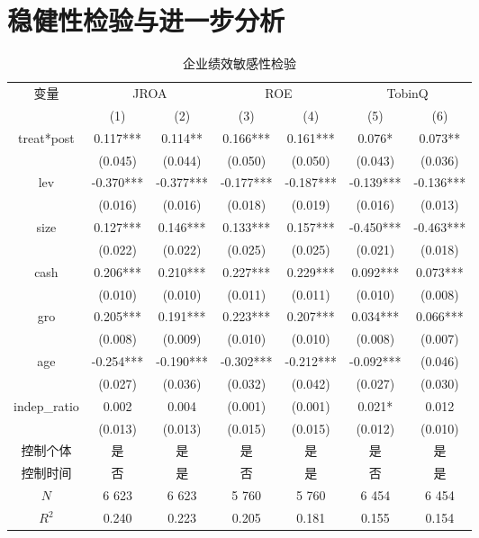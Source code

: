 \documentclass{beamer}	%
\theoremstyle{plain}
\theoremstyle{definition}
\theoremstyle{remark}
\numberwithin{equation}{section}
\begin{document}
\section{稳健性检验与进一步分析}
\begin{frame}
\begin{table}[htbp]
	\tiny
	\centering
	\caption{企业绩效敏感性检验}
	\label{企业绩效敏感性检验}%
	\begin{tabular}{ccccccc}
		\toprule
		\multirow{2}[3]{*}{变量} & \multicolumn{2}{c}{JROA} & \multicolumn{2}{c}{ROE} & \multicolumn{2}{c}{TobinQ} \\
		\cmidrule{2-7}          & (1)    & (2)    & (3)    & (4)    & (5)    & (6) \\
		\midrule
		\multirow{2}[0]{*}{treat*post} & \textcolor[rgb]{1.000, 0.000, 0.000}{0.117***} & \textcolor[rgb]{1.000, 0.000, 0.000}{0.114**} & \textcolor[rgb]{1.000, 0.000, 0.000}{0.166***} & \textcolor[rgb]{1.000, 0.000, 0.000}{0.161***} & \textcolor[rgb]{1.000, 0.000, 0.000}{0.076*} & \textcolor[rgb]{1.000, 0.000, 0.000}{0.073**} \\
		& (0.045) & (0.044) & (0.050) & (0.050) & (0.043) & (0.036) \\
		\multirow{2}[0]{*}{lev} & -0.370*** & -0.377*** & -0.177*** & -0.187*** & -0.139*** & -0.136*** \\
		& (0.016) & (0.016) & (0.018) & (0.019) & (0.016) & (0.013) \\
		\multirow{2}[0]{*}{size} & 0.127*** & 0.146*** & 0.133*** & 0.157*** & -0.450*** & -0.463*** \\
		& (0.022) & (0.022) & (0.025) & (0.025) & (0.021) & (0.018) \\
		\multirow{2}[0]{*}{cash} & 0.206*** & 0.210*** & 0.227*** & 0.229*** & 0.092*** & 0.073*** \\
		& (0.010) & (0.010) & (0.011) & (0.011) & (0.010) & (0.008) \\
		\multirow{2}[0]{*}{gro} & 0.205*** & 0.191*** & 0.223*** & 0.207*** & 0.034*** & 0.066*** \\
		& (0.008) & (0.009) & (0.010) & (0.010) & (0.008) & (0.007) \\
		\multirow{2}[0]{*}{age} & -0.254*** & -0.190*** & -0.302*** & -0.212*** & -0.092*** & (0.046) \\
		& (0.027) & (0.036) & (0.032) & (0.042) & (0.027) & (0.030) \\
		\multirow{2}[0]{*}{indep\_ratio} & 0.002  & 0.004  & (0.001) & (0.001) & 0.021* & 0.012  \\
		& (0.013) & (0.013) & (0.015) & (0.015) & (0.012) & (0.010) \\
		控制个体  & 是     & 是     & 是     & 是     & 是     & 是 \\
		控制时间  & 否     & 是     & 否     & 是     & 否     & 是 \\
		$N$     & 6 623 & 6 623 & 5 760 & 5 760 & 6 454 & 6 454 \\

		$R^2$     & 0.240  & 0.223  & 0.205  & 0.181  & 0.155  & 0.154  \\
		\bottomrule
	\end{tabular}%
\end{table}%
\end{frame}
\end{document}
